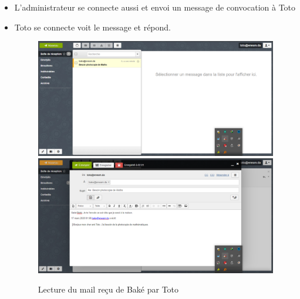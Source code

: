 \documentclass[a4paper,12pt,french]{report} %
\begin{document}
\begin{itemize}
\item L'administrateur se connecte aussi et envoi un message de convocation à Toto 
\item Toto se connecte voit le message et répond.
\begin{figure}[H]
\centering
\includegraphics[scale=0.5]{figure/toto_see_mail_from_bake1.png} \\[1cm]
\includegraphics[scale=0.5]{figure/toto_reply_to_bake1.png}
\caption{Lecture du mail reçu de Baké par Toto}
\end{figure} 


\end{itemize}
\end{document}
